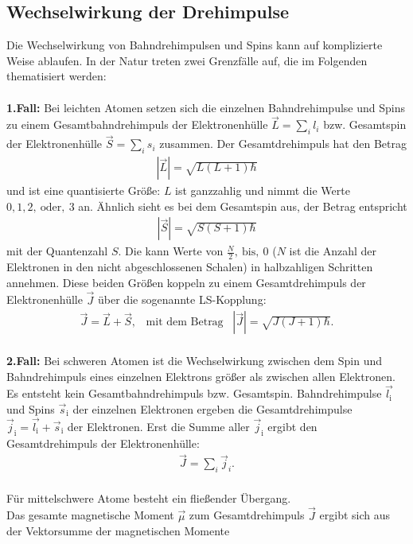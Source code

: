 \subsection{Wechselwirkung der Drehimpulse}
Die Wechselwirkung von Bahndrehimpulsen und Spins kann auf komplizierte Weise ablaufen.
In der Natur treten zwei Grenzfälle auf, die im Folgenden thematisiert werden:\\
\\
\textbf{1.Fall:} Bei leichten Atomen setzen sich die einzelnen Bahndrehimpulse und Spins
zu einem Gesamtbahndrehimpuls der Elektronenhülle $\vec{L}=\sum_i l_i$
bzw. Gesamtspin der Elektronenhülle $\vec{S}=\sum_i s_i$ zusammen.
Der Gesamtdrehimpuls hat den Betrag
\begin{align}
 |\vec{L}|=\sqrt{L(L+1)\hbar}
\end{align}
und ist eine quantisierte Größe:
$L$ ist ganzzahlig und nimmt die Werte $0,1,2 ,\ \text{oder} ,\ 3$ an.
Ähnlich sieht es bei dem Gesamtspin aus, der Betrag entspricht
\begin{align}
 |\vec{S}|=\sqrt{S(S+1)\hbar}
\end{align}
mit der Quantenzahl $S$. Die kann Werte von $\frac{N}{2} ,\ \text{bis} ,\ 0$
($N$ ist die Anzahl der Elektronen in den nicht abgeschlossenen Schalen)
in halbzahligen Schritten annehmen.
Diese beiden Größen koppeln zu einem Gesamtdrehimpuls der Elektronenhülle $\vec{J}$ über die sogenannte LS-Kopplung:
\begin{align}
  \vec{J}=\vec{L}+\vec{S} ,\,\,\,\,\, \text{mit dem Betrag}\,\,\,\,\,|\vec{J}|=\sqrt{J(J+1)\hbar}.
\end{align}\\
\textbf{2.Fall:} Bei schweren Atomen ist die Wechselwirkung zwischen dem Spin und
Bahndrehimpuls eines einzelnen Elektrons größer als zwischen allen Elektronen.
Es entsteht kein Gesamtbahndrehimpuls bzw. Gesamtspin.
Bahndrehimpulse $\vec{\textit{l}_\mathrm{i}}$ und Spins $\vec{s}_\mathrm{i}$ der einzelnen Elektronen ergeben
die Gesamtdrehimpulse $\vec{j}_\mathrm{i}=\vec{\textit{l}_\mathrm{i}}+\vec{s}_\mathrm{i}$ der Elektronen.
Erst die Summe aller $\vec{j}_\mathrm{i}$ ergibt den Gesamtdrehimpuls der Elektronenhülle:
\begin{align}
\vec{J}=\sum_i \vec{j}_i.
\end{align}\\
Für mittelschwere Atome besteht ein fließender Übergang.
\\
Das gesamte magnetische Moment $\vec{\mu}$ zum Gesamtdrehimpuls $\vec{J}$ ergibt sich aus der Vektorsumme der magnetischen Momente
